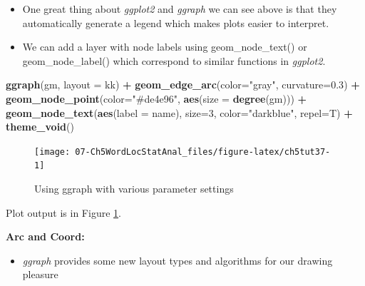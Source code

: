 \documentclass[
]{article}
\newenvironment{Shaded}{\begin{snugshade}}{\end{snugshade}}
\newcommand{\AttributeTok}[1]{\textcolor[rgb]{0.13,0.29,0.53}{#1}}
\newcommand{\DecValTok}[1]{\textcolor[rgb]{0.00,0.00,0.81}{#1}}
\newcommand{\FloatTok}[1]{\textcolor[rgb]{0.00,0.00,0.81}{#1}}
\newcommand{\FunctionTok}[1]{\textcolor[rgb]{0.13,0.29,0.53}{\textbf{#1}}}
\newcommand{\NormalTok}[1]{#1}
\newcommand{\SpecialCharTok}[1]{\textcolor[rgb]{0.81,0.36,0.00}{\textbf{#1}}}
\newcommand{\StringTok}[1]{\textcolor[rgb]{0.31,0.60,0.02}{#1}}
\providecommand{\tightlist}{%
  \setlength{\itemsep}{0pt}\setlength{\parskip}{0pt}}
\begin{document}
\begin{itemize}
\tightlist
\item
  One great thing about \emph{ggplot2} and \emph{ggraph} we can see above is that they automatically generate a legend which makes plots easier to interpret.
\item
  We can add a layer with node labels using geom\_node\_text() or geom\_node\_label() which correspond to similar functions in \emph{ggplot2}.
\end{itemize}

\begin{Shaded}
\begin{Highlighting}[]
\FunctionTok{ggraph}\NormalTok{(gm,  }\AttributeTok{layout =} \StringTok{\textquotesingle{}kk\textquotesingle{}}\NormalTok{) }\SpecialCharTok{+}
  \FunctionTok{geom\_edge\_arc}\NormalTok{(}\AttributeTok{color=}\StringTok{"gray"}\NormalTok{, }\AttributeTok{curvature=}\FloatTok{0.3}\NormalTok{) }\SpecialCharTok{+}            
  \FunctionTok{geom\_node\_point}\NormalTok{(}\AttributeTok{color=}\StringTok{"\#de4e96"}\NormalTok{, }\FunctionTok{aes}\NormalTok{(}\AttributeTok{size =} \FunctionTok{degree}\NormalTok{(gm))) }\SpecialCharTok{+}     
  \FunctionTok{geom\_node\_text}\NormalTok{(}\FunctionTok{aes}\NormalTok{(}\AttributeTok{label =}\NormalTok{ name), }\AttributeTok{size=}\DecValTok{3}\NormalTok{, }\AttributeTok{color=}\StringTok{"darkblue"}\NormalTok{, }
                 \AttributeTok{repel=}\NormalTok{T) }\SpecialCharTok{+}
  \FunctionTok{theme\_void}\NormalTok{()}
\end{Highlighting}
\end{Shaded}

\begin{figure}

{\centering \texttt{[image: 07-Ch5WordLocStatAnal\_files/figure-latex/ch5tut37-1]} 

}

\caption{Using ggraph with various parameter settings}\label{fig:ch5tut37}
\end{figure}

Plot output is in Figure \ref{fig:ch5tut37}.

\textbf{Arc and Coord:}

\begin{itemize}
\tightlist
\item
  \emph{ggraph} provides some new layout types and algorithms for our drawing pleasure
\end{itemize}
\end{document}
